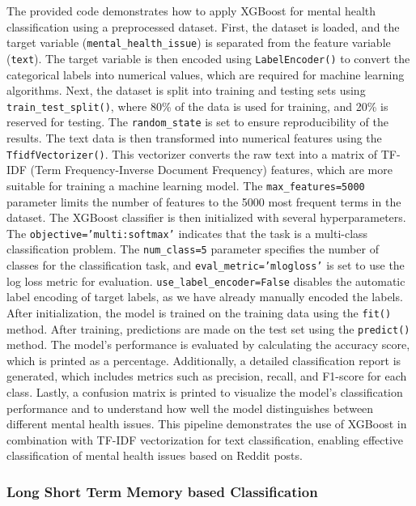 \noindent
The provided code demonstrates how to apply XGBoost for mental health classification using a preprocessed dataset. First, the dataset is loaded, and the target variable (\texttt{mental\_health\_issue}) is separated from the feature variable (\texttt{text}). The target variable is then encoded using \texttt{LabelEncoder()} to convert the categorical labels into numerical values, which are required for machine learning algorithms. Next, the dataset is split into training and testing sets using \texttt{train\_test\_split()}, where 80\% of the data is used for training, and 20\% is reserved for testing. The \texttt{random\_state} is set to ensure reproducibility of the results. The text data is then transformed into numerical features using the \texttt{TfidfVectorizer()}. This vectorizer converts the raw text into a matrix of TF-IDF (Term Frequency-Inverse Document Frequency) features, which are more suitable for training a machine learning model. The \texttt{max\_features=5000} parameter limits the number of features to the 5000 most frequent terms in the dataset. The XGBoost classifier is then initialized with several hyperparameters. The \texttt{objective='multi:softmax'} indicates that the task is a multi-class classification problem. The \texttt{num\_class=5} parameter specifies the number of classes for the classification task, and \texttt{eval\_metric='mlogloss'} is set to use the log loss metric for evaluation. \texttt{use\_label\_encoder=False} disables the automatic label encoding of target labels, as we have already manually encoded the labels. After initialization, the model is trained on the training data using the \texttt{fit()} method. After training, predictions are made on the test set using the \texttt{predict()} method. The model's performance is evaluated by calculating the accuracy score, which is printed as a percentage. Additionally, a detailed classification report is generated, which includes metrics such as precision, recall, and F1-score for each class. Lastly, a confusion matrix is printed to visualize the model's classification performance and to understand how well the model distinguishes between different mental health issues. This pipeline demonstrates the use of XGBoost in combination with TF-IDF vectorization for text classification, enabling effective classification of mental health issues based on Reddit posts.

\subsubsection{Long Short Term Memory based Classification}

